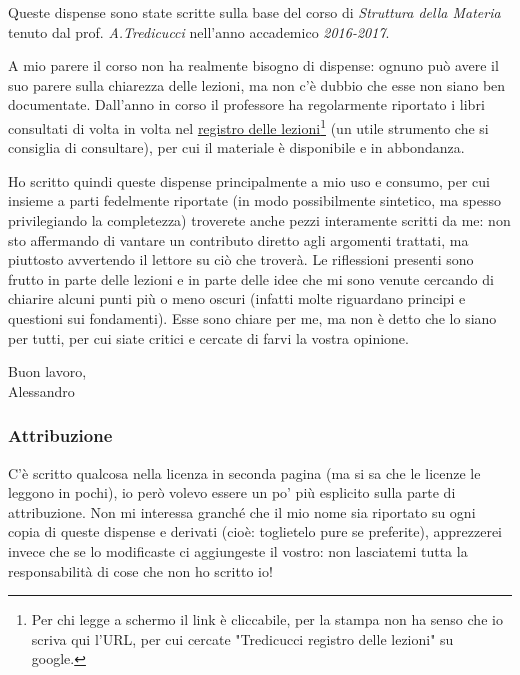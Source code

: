 Queste dispense sono state scritte sulla base del corso di \textit{Struttura della Materia} tenuto dal prof. \textit{A.Tredicucci} nell'anno accademico \textit{2016-2017}.
\newline

A mio parere il corso non ha realmente bisogno di dispense: ognuno può avere il suo parere sulla chiarezza delle lezioni, ma non c'è dubbio che esse non siano ben documentate. Dall'anno in corso il professore ha regolarmente riportato i libri consultati di volta in volta nel \href{http://unimap.unipi.it/registri/dettregistriNEW.php?re=181626::::&ri=12126}{registro delle lezioni}\footnote{Per chi legge a schermo il link è cliccabile, per la stampa non ha senso che io scriva qui l'URL, per cui cercate "Tredicucci registro delle lezioni" su google.} (un utile strumento che si consiglia di consultare), per cui il materiale è disponibile e in abbondanza.
\newline

Ho scritto quindi queste dispense principalmente a mio uso e consumo, per cui insieme a parti fedelmente riportate (in modo possibilmente sintetico, ma spesso privilegiando la completezza) troverete anche pezzi interamente scritti da me: non sto affermando di vantare un contributo diretto agli argomenti trattati, ma piuttosto avvertendo il lettore su ciò che troverà. Le riflessioni presenti sono frutto in parte delle lezioni e in parte delle idee che mi sono venute cercando di chiarire alcuni punti più o meno oscuri (infatti molte riguardano principi e questioni sui fondamenti). Esse sono chiare per me, ma non è detto che lo siano per tutti, per cui siate critici e cercate di farvi la vostra opinione.

\begin{flushright}
	Buon lavoro,\\
	Alessandro
\end{flushright}

\subsubsection*{Attribuzione}
C'è scritto qualcosa nella licenza in seconda pagina (ma si sa che le licenze le leggono in pochi), io però volevo essere un po' più esplicito sulla parte di attribuzione. Non mi interessa granché che il mio nome sia riportato su ogni copia di queste dispense e derivati (cioè: toglietelo pure se preferite), apprezzerei invece che se lo modificaste ci aggiungeste il vostro: non lasciatemi tutta la responsabilità di cose che non ho scritto io!
